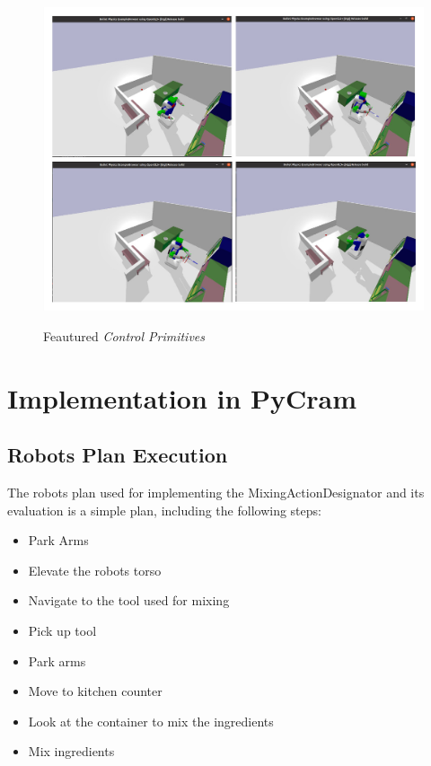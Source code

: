 \begin{figure}[H]
    \centering
    \includegraphics[scale=0.3]{Graphics/control_primitives.jpg}
    \label{fig:controlprimitives}
    \caption{Feautured \textit{Control Primitives}}
\end{figure}

\section{Implementation in PyCram}

\subsection{Robots Plan Execution}
The robots plan used for implementing the MixingActionDesignator and its evaluation is 
a simple plan, including the following steps:

\begin{itemize}
    \item Park Arms
    \item Elevate the robots torso
    \item Navigate to the tool used for mixing
    \item Pick up tool
    \item Park arms
    \item Move to kitchen counter
    \item Look at the container to mix the ingredients
    \item Mix ingredients
\end{itemize}

